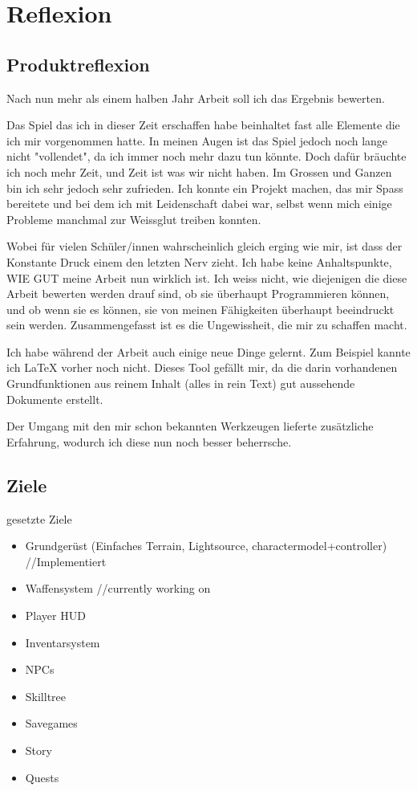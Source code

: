\chapter{Reflexion }
\section{Produktreflexion}
Nach nun mehr als einem halben Jahr Arbeit soll ich das Ergebnis bewerten.

Das Spiel das ich in dieser Zeit erschaffen habe beinhaltet fast alle Elemente die ich mir vorgenommen hatte.
In meinen Augen ist das Spiel jedoch noch lange nicht "vollendet", da ich immer noch mehr dazu tun könnte.
Doch dafür bräuchte ich noch mehr Zeit, und Zeit ist was wir nicht haben.
Im Grossen und Ganzen bin ich sehr jedoch sehr zufrieden. Ich konnte ein Projekt machen, das mir Spass bereitete und bei dem ich mit Leidenschaft dabei war, selbst wenn mich einige Probleme manchmal zur Weissglut treiben konnten. 

Wobei für vielen Schüler/innen wahrscheinlich gleich erging wie mir, ist dass der Konstante Druck einem den letzten Nerv zieht.
Ich habe keine Anhaltspunkte, WIE GUT meine Arbeit nun wirklich ist.
Ich weiss nicht, wie diejenigen die diese Arbeit bewerten werden drauf sind, ob sie überhaupt Programmieren können, und ob wenn sie es können, sie von meinen Fähigkeiten überhaupt beeindruckt sein werden.
Zusammengefasst ist es die Ungewissheit, die mir zu schaffen macht.

Ich habe während der Arbeit auch einige neue Dinge gelernt.
Zum Beispiel kannte ich LaTeX vorher noch nicht.
Dieses Tool gefällt mir, da die darin vorhandenen Grundfunktionen aus reinem Inhalt (alles in rein Text) gut aussehende Dokumente erstellt.

Der Umgang mit den mir schon bekannten Werkzeugen lieferte zusätzliche Erfahrung, wodurch ich diese nun noch besser beherrsche.

\section{Ziele}

gesetzte Ziele

\begin{itemize}
\item Grundgerüst (Einfaches Terrain, Lightsource, charactermodel+controller) //Implementiert
\item Waffensystem	//currently working on
\item Player HUD
\item Inventarsystem
\item NPCs
\item Skilltree
\item Savegames
\item Story
\item Quests

\end{itemize}

